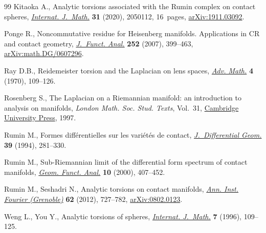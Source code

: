 \documentclass[pdftex]{sigma}
\numberwithin{equation}{section}
\begin{document}
\begin{thebibliography}{99}
Kitaoka A., Analytic torsions associated with the {R}umin complex on contact
 spheres, \href{https://doi.org/10.1142/S0129167X20501128}{\textit{Internat. J.~Math.}} \textbf{31} (2020), 2050112, 16~pages,
 \href{http://arxiv.org/abs/1911.03092}{arXiv:1911.03092}.

Ponge R., Noncommutative residue for {H}eisenberg manifolds. {A}pplications in
 {CR} and contact geometry, \href{https://doi.org/10.1016/j.jfa.2007.07.001}{\textit{J.~Funct. Anal.}} \textbf{252} (2007),
 399--463, \href{http://arxiv.org/abs/math.DG/0607296}{arXiv:math.DG/0607296}.

Ray D.B., Reidemeister torsion and the {L}aplacian on lens spaces, \href{https://doi.org/10.1016/0001-8708(70)90018-6}{\textit{Adv.
 Math.}} \textbf{4} (1970), 109--126.

Rosenberg S., The Laplacian on a Riemannian manifold: an introduction to
 analysis on manifolds, \textit{London Math. Soc. Stud. Texts}, Vol.~31,
 \href{https://doi.org/10.1017/CBO9780511623783}{Cambridge University Press}, 1997.

Rumin M., Formes diff\'erentielles sur les vari\'et\'es de contact,
 \href{https://doi.org/10.4310/jdg/1214454873}{\textit{J.~Differential Geom.}} \textbf{39} (1994), 281--330.

Rumin M., Sub-{R}iemannian limit of the differential form spectrum of contact
 manifolds, \href{https://doi.org/10.1007/s000390050013}{\textit{Geom. Funct. Anal.}} \textbf{10} (2000), 407--452.

Rumin M., Seshadri N., Analytic torsions on contact manifolds, \href{https://doi.org/10.5802/aif.2693}{\textit{Ann.
 Inst. Fourier (Grenoble)}} \textbf{62} (2012), 727--782, \href{http://arxiv.org/abs/0802.0123}{arXiv:0802.0123}.

Weng L., You Y., Analytic torsions of spheres, \href{https://doi.org/10.1142/S0129167X96000074}{\textit{Internat. J.~Math.}}
 \textbf{7} (1996), 109--125.

\end{thebibliography}
\LastPageEnding
\end{document}
